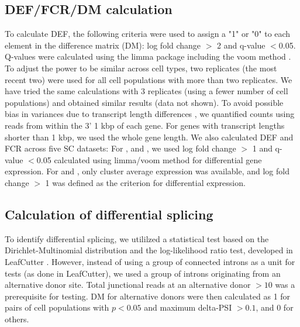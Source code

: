 \subsection{DEF/FCR/DM calculation}
To calculate DEF, the following criteria were used to assign a "1" or "0" to each element in the difference matrix (DM): log fold change $>$ 2 and q-value $<$0.05. Q-values were calculated using the limma package including the voom method \citep{Law_2014}. To adjust the power to be similar across cell types, two replicates (the most recent two) were used for all cell populations with more than two replicates. We have tried the same calculations with 3 replicates (using a fewer number of cell populations) and obtained similar results (data not shown). To avoid possible bias in variances due to transcript length differences \citep{Oshlack_2009}, we quantified counts using reads from within the 3' 1 kbp of each gene. For genes with transcript lengths shorter than 1 kbp, we used the whole gene length. 
We also calculated DEF and FCR across five SC datasets: For \cite{Zeisel_2015}, \cite{Tasic_2016} and \cite{Tasic_2018}, we used log fold change $>$ 1 and q-value $<$0.05 calculated using limma/voom method for differential gene expression. For \cite{Saunders_2018} and \cite{Zeisel_2018}, only cluster average expression was available, and log fold change $>$ 1 was defined as the criterion for differential expression.


\subsection{Calculation of differential splicing}
To identify differential splicing, we utililzed a statistical test based on the Dirichlet-Multinomial distribution and the log-likelihood ratio test, developed in LeafCutter \citep{Li_2016}. However, instead of using a group of connected introns as a unit for tests (as done in LeafCutter), we used a group of introns originating from an alternative donor site. Total junctional reads at an alternative donor $> 10$ was a prerequisite for testing. DM for alternative donors were then calculated as 1 for pairs of cell populations with $p < 0.05$ and maximum delta-PSI $> 0.1$, and 0 for others. 

